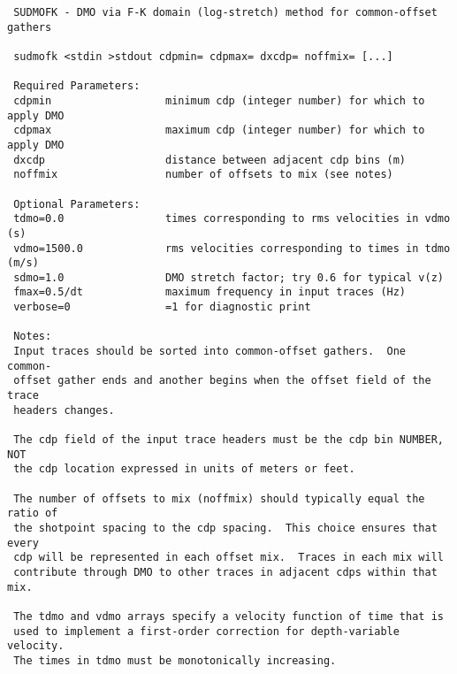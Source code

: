 {{{\begin{verbatim}
 SUDMOFK - DMO via F-K domain (log-stretch) method for common-offset gathers
                                                                        
 sudmofk <stdin >stdout cdpmin= cdpmax= dxcdp= noffmix= [...]           
                                                                        
 Required Parameters:                                                   
 cdpmin                  minimum cdp (integer number) for which to apply DMO
 cdpmax                  maximum cdp (integer number) for which to apply DMO
 dxcdp                   distance between adjacent cdp bins (m) 
 noffmix                 number of offsets to mix (see notes)           
                                                                        
 Optional Parameters:                                                   
 tdmo=0.0                times corresponding to rms velocities in vdmo (s)
 vdmo=1500.0             rms velocities corresponding to times in tdmo (m/s)
 sdmo=1.0                DMO stretch factor; try 0.6 for typical v(z)   
 fmax=0.5/dt             maximum frequency in input traces (Hz) 
 verbose=0               =1 for diagnostic print                        
                                                                        
 Notes:                                                         
 Input traces should be sorted into common-offset gathers.  One common- 
 offset gather ends and another begins when the offset field of the trace
 headers changes.                                                       
                                                                        
 The cdp field of the input trace headers must be the cdp bin NUMBER, NOT
 the cdp location expressed in units of meters or feet.         
                                                                        
 The number of offsets to mix (noffmix) should typically equal the ratio of
 the shotpoint spacing to the cdp spacing.  This choice ensures that every
 cdp will be represented in each offset mix.  Traces in each mix will   
 contribute through DMO to other traces in adjacent cdps within that mix.
                                                                        
 The tdmo and vdmo arrays specify a velocity function of time that is   
 used to implement a first-order correction for depth-variable velocity.
 The times in tdmo must be monotonically increasing.                    
                                                                        

\end{verbatim}}}}
